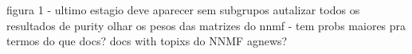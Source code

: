 figura 1 - ultimo estagio deve aparecer sem subgrupos
autalizar todos os resultados de purity
olhar os pesos das matrizes do nnmf - tem probs maiores pra termos do que docs?
docs with topixs do NNMF agnews?
